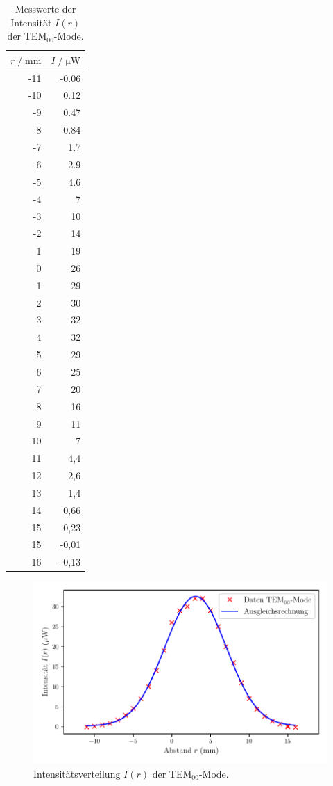 \begin{table}[H]
  \centering
  \footnotesize
  \caption{Messwerte der Intensität $I(r)$ der TEM$_{00}$-Mode.}
  \label{tab:TEM00}
  \begin{tabular}{r r}
  \toprule
  $r \;/\; \si{\milli\meter}$ & $I \;/\; \si{\micro\watt}$ \\
  \midrule
-11 & -0.06   \\
-10 & 0.12    \\
-9  & 0.47    \\
-8  &  0.84   \\
-7  &  1.7    \\
-6  &  2.9    \\
-5  &  4.6    \\
-4  &  7    \\
-3  &  10   \\
-2  &  14   \\
-1  &  19   \\
0   &  26   \\
1   &  29   \\
2   &  30   \\
3   &  32   \\
4   &  32   \\
5   &  29   \\
6   &  25   \\
7   &  20   \\
8   &  16   \\
9   &  11   \\
10  &  7    \\
11  &  4,4    \\
12  &  2,6    \\
13  &  1,4    \\
14  &  0,66   \\
15  &  0,23   \\
15  &  -0,01    \\
16  &  -0,13    \\
  \bottomrule
  \end{tabular}
\end{table}

\begin{figure}[H]
  \centering
  \includegraphics[scale=0.65]{TEM00.pdf}
  \vspace{-10pt}
  \caption{Intensitätsverteilung $I(r)$ der TEM$_{00}$-Mode.}
  \label{fig:TEM00}
\end{figure}


